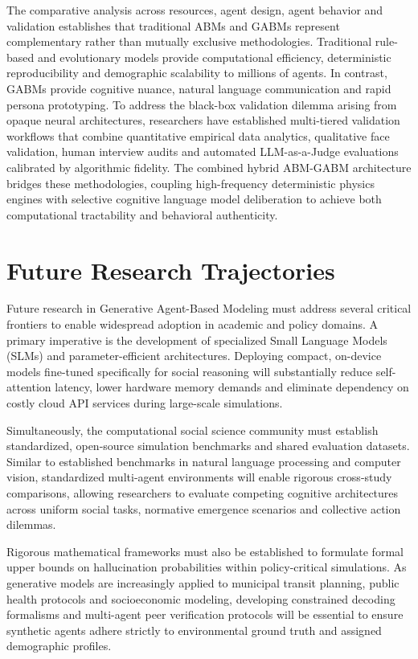 \documentclass[12pt,a4paper]{report}
\begin{document}
The comparative analysis across resources, agent design, agent behavior and validation establishes that traditional ABMs and GABMs represent complementary rather than mutually exclusive methodologies. Traditional rule-based and evolutionary models provide computational efficiency, deterministic reproducibility and demographic scalability to millions of agents. In contrast, GABMs provide cognitive nuance, natural language communication and rapid persona prototyping. To address the black-box validation dilemma arising from opaque neural architectures, researchers have established multi-tiered validation workflows that combine quantitative empirical data analytics, qualitative face validation, human interview audits and automated LLM-as-a-Judge evaluations calibrated by algorithmic fidelity. The combined hybrid ABM-GABM architecture bridges these methodologies, coupling high-frequency deterministic physics engines with selective cognitive language model deliberation to achieve both computational tractability and behavioral authenticity.

\section{Future Research Trajectories}
\label{sec:conclusion_future}

Future research in Generative Agent-Based Modeling must address several critical frontiers to enable widespread adoption in academic and policy domains. A primary imperative is the development of specialized Small Language Models (SLMs) and parameter-efficient architectures. Deploying compact, on-device models fine-tuned specifically for social reasoning will substantially reduce self-attention latency, lower hardware memory demands and eliminate dependency on costly cloud API services during large-scale simulations.

Simultaneously, the computational social science community must establish standardized, open-source simulation benchmarks and shared evaluation datasets. Similar to established benchmarks in natural language processing and computer vision, standardized multi-agent environments will enable rigorous cross-study comparisons, allowing researchers to evaluate competing cognitive architectures across uniform social tasks, normative emergence scenarios and collective action dilemmas.

Rigorous mathematical frameworks must also be established to formulate formal upper bounds on hallucination probabilities within policy-critical simulations. As generative models are increasingly applied to municipal transit planning, public health protocols and socioeconomic modeling, developing constrained decoding formalisms and multi-agent peer verification protocols will be essential to ensure synthetic agents adhere strictly to environmental ground truth and assigned demographic profiles.
\end{document}
